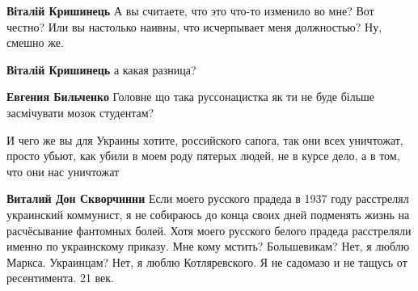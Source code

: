 \begin{itemize}
\begin{itemize}
 
\textbf{Віталій Кришинець} А вы считаете, что это что-то изменило во мне? Вот честно? Или вы настолько наивны, что исчерпывает меня должностью? Ну, смешно же.

 
\textbf{Віталій Кришинець} а какая разница?

 
\textbf{Евгения Бильченко} Головне що така руссонацистка як ти не буде більше засмічувати мозок студентам?

\end{itemize}


И чего же вы для Украины хотите, российского сапога, так они всех уничтожат,
просто убьют, как убили в моем роду пятерых людей, не в курсе дело, а в том,
что они нас уничтожат

\begin{itemize}
 
\textbf{Виталий Дон Скворчинни} Если моего русского прадеда в 1937 году
расстрелял украинский коммунист, я не собираюсь до конца своих дней подменять
жизнь на расчёсывание фантомных болей. Хотя моего русского белого прадеда
расстреляли именно по украинскому приказу. Мне кому мстить? Большевикам? Нет, я
люблю Маркса. Украинцам? Нет, я люблю Котляревского. Я не садомазо и не тащусь
от ресентимента. 21 век.


\end{itemize}
\end{itemize}
